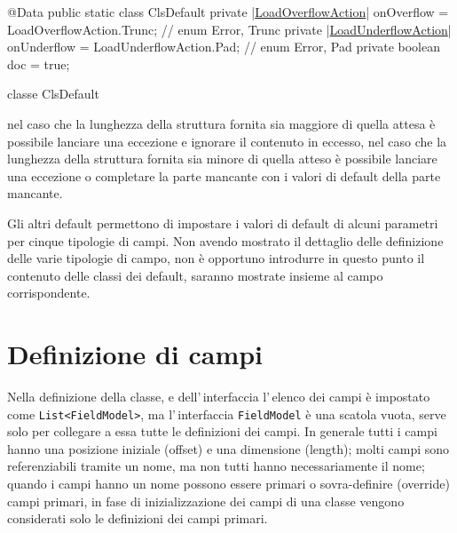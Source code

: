 \documentclass[a4paper,10pt]{report}
\newif\ifesource
\newenvironment{elisting}[1][!htb]
  {\captionsetup{aboveskip=0pt}\begin{listing}[#1]}
  {\end{listing}%
}
\begin{document}
\ifesource
\begin{figure*}[!htb]
\begin{lstlisting}[language=java, caption=classe ClsDefault, 
label=lst:ClsDefault]
@Data
public static class ClsDefault {
    private (*\hyperref[lst:LoadOverflowAction]{LoadOverflowAction}*) onOverflow = LoadOverflowAction.Trunc;   // enum {Error, Trunc}
    private (*\hyperref[lst:LoadUnderflowAction]{LoadUnderflowAction}*) onUnderflow = LoadUnderflowAction.Pad;  // enum {Error, Pad}
    private boolean doc = true;
}
\end{lstlisting}
\end{figure*}
\else
\begin{elisting}
\begin{javacode}
@Data
public static class ClsDefault {
    private |\hyperref[lst:LoadOverflowAction]{LoadOverflowAction}| onOverflow = LoadOverflowAction.Trunc;   // enum {Error, Trunc}
    private |\hyperref[lst:LoadUnderflowAction]{LoadUnderflowAction}| onUnderflow = LoadUnderflowAction.Pad;  // enum {Error, Pad}
    private boolean doc = true;
}
\end{javacode}
\caption{classe ClsDefault}
\label{lst:ClsDefault}
\end{elisting}
\fi
nel caso che la lunghezza della struttura fornita sia maggiore di quella attesa
è possibile lanciare una eccezione e ignorare il contenuto in eccesso,
nel caso che la lunghezza della struttura fornita sia minore di quella atteso è
possibile lanciare una eccezione o completare la parte mancante con i valori di
default della parte mancante.

Gli altri default permettono di impostare i valori di default di alcuni 
parametri per cinque tipologie di campi. Non avendo mostrato il dettaglio delle 
definizione delle varie tipologie di campo, non è opportuno introdurre in 
questo punto il contenuto delle classi dei default, saranno mostrate insieme al 
campo corrispondente.

\section{Definizione di campi}
Nella definizione della classe, e dell'\,interfaccia l'\,elenco dei campi è
impostato come \verb!List<FieldModel>!, ma l'\,interfaccia \verb!FieldModel! è
una scatola vuota, serve solo per collegare a essa tutte le definizioni dei
campi. In generale tutti i campi hanno una posizione iniziale (offset) e una
dimensione (length); molti campi sono referenziabili tramite un nome, 
ma non tutti hanno necessariamente il nome; quando i campi hanno un nome
possono essere primari o sovra-definire (override) campi primari, in fase di 
inizializzazione dei campi di una classe vengono considerati solo le definizioni
dei campi primari.
\end{document}
